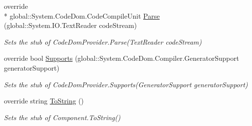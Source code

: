 \begin{DoxyCompactItemize}
override \\*
global\-::\-System.\-Code\-Dom.\-Code\-Compile\-Unit \hyperlink{class_microsoft_1_1_visual_basic_1_1_fakes_1_1_stub_v_b_code_provider_a664dd4065f2af9ba76f1c7c797d0deb4}{Parse} (global\-::\-System.\-I\-O.\-Text\-Reader code\-Stream)
\begin{DoxyCompactList}\small\item\em Sets the stub of Code\-Dom\-Provider.\-Parse(\-Text\-Reader code\-Stream)\end{DoxyCompactList}\item 
override bool \hyperlink{class_microsoft_1_1_visual_basic_1_1_fakes_1_1_stub_v_b_code_provider_a6621c15ba1f9fa46697557b461008f61}{Supports} (global\-::\-System.\-Code\-Dom.\-Compiler.\-Generator\-Support generator\-Support)
\begin{DoxyCompactList}\small\item\em Sets the stub of Code\-Dom\-Provider.\-Supports(\-Generator\-Support generator\-Support)\end{DoxyCompactList}\item 
override string \hyperlink{class_microsoft_1_1_visual_basic_1_1_fakes_1_1_stub_v_b_code_provider_aff746c61f4a9484269b9b4ab2b93f227}{To\-String} ()
\begin{DoxyCompactList}\small\item\em Sets the stub of Component.\-To\-String()\end{DoxyCompactList}\end{DoxyCompactItemize}

